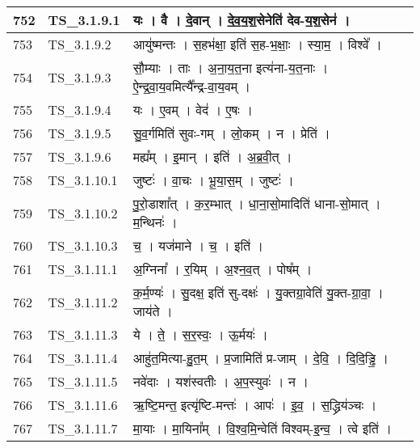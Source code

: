 \documentclass[17pt]{extarticle}
\begin{document}
\begin{longtable}{||p{0.4in}||p{0.9in}||p{4.0in}||p{0.9in}||}
        \hline
            752 & TS\_3.1.9.1 & यः   ।   वै   ।   दे॒वान्   ।   दे॒व॒य॒श॒सेनेति॑ देव{-}य॒श॒सेन॑   ।    &      \\
        \hline
            753 & TS\_3.1.9.2 & आयु॑ष्मन्तः   ।   स॒हभ॑क्षा॒ इति॑ स॒ह{-}भ॒क्षाः॒   ।   स्या॒म॒   ।   विश्वे᳚   ।    &      \\
        \hline
            754 & TS\_3.1.9.3 & सौ॒म्याः   ।   ताः   ।   अ॒ना॒य॒त॒ना इत्य॑ना{-}य॒त॒नाः   ।   ऐ॒न्द्र॒वा॒य॒वमित्यै᳚न्द्र{-}वा॒य॒वम्   ।    &      \\
        \hline
            755 & TS\_3.1.9.4 & यः   ।   ए॒वम्   ।   वेद॑   ।   ए॒षः   ।    &      \\
        \hline
            756 & TS\_3.1.9.5 & सु॒व॒र्गमिति॑ सुवः{-}गम्   ।   लो॒कम्   ।   न   ।   प्रेति॑   ।    &      \\
        \hline
            757 & TS\_3.1.9.6 & मह्य᳚म्   ।   इ॒मान्   ।   इति॑   ।   अ॒ब्र॒वी॒त्   ।    &      \\
        \hline
            758 & TS\_3.1.10.1 & जुष्टः॑   ।   वा॒चः   ।   भू॒या॒स॒म्   ।   जुष्टः॑   ।    &      \\
        \hline
            759 & TS\_3.1.10.2 & पु॒रो॒डाशा᳚त्   ।   क॒र॒म्भात्   ।   धा॒ना॒सो॒मादिति॑ धाना{-}सो॒मात्   ।   म॒न्थिनः॑   ।    &      \\
        \hline
            760 & TS\_3.1.10.3 & च॒   ।   यज॑माने   ।   च॒   ।   इति॑   ।    &      \\
        \hline
            761 & TS\_3.1.11.1 & अ॒ग्निना᳚   ।   र॒यिम्   ।   अ॒श्न॒व॒त्   ।   पोष᳚म्   ।    &      \\
        \hline
            762 & TS\_3.1.11.2 & क॒र्म॒ण्यः॑   ।   सु॒दक्ष॒ इति॑ सु{-}दक्षः॑   ।   यु॒क्तग्रा॒वेति॑ यु॒क्त{-}ग्रा॒वा॒   ।   जाय॑ते   ।    &      \\
        \hline
            763 & TS\_3.1.11.3 & ये   ।   ते॒   ।   स॒र॒स्वः॒   ।   ऊ॒र्मयः॑   ।    &      \\
        \hline
            764 & TS\_3.1.11.4 & आहु॑त॒मित्या{-}हु॒त॒म्   ।   प्र॒जामिति॑ प्र{-}जाम्   ।   दे॒वि॒   ।   दि॒दि॒ड्ढि॒   ।    &      \\
        \hline
            765 & TS\_3.1.11.5 & नवे॑दाः   ।   यश॑स्वतीः   ।   अ॒प॒स्युवः॑   ।   न   ।    &      \\
        \hline
            766 & TS\_3.1.11.6 & ऋ॒ष्टि॒मन्त॒ इत्यृ॑ष्टि{-}मन्तः॑   ।   आपः॑   ।   इ॒व॒   ।   स॒द्ध्रिय॑ञ्चः   ।    &      \\
        \hline
            767 & TS\_3.1.11.7 & मा॒याः   ।   मा॒यिना᳚म्   ।   वि॒श्व॒मि॒न्वेति॑ विश्वम्{-}इ॒न्व॒   ।   त्वे इति॑   ।    &      \\

\end{longtable}
\end{document}
